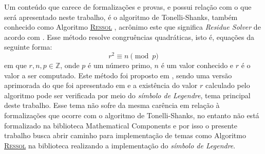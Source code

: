 
Um conteúdo que carece de formalizações e provas, e possui relação com o que será apresentado neste trabalho, é o algoritmo de Tonelli-Shanks, também conhecido como Algoritmo \hyperref[algo:ressol]{\textsc{Ressol}} \cite{Huynh1581080}, acrônimo este que significa \textit{Residue Solver} de acordo com \cite{Niven1915}. Esse método resolve congruências quadráticas, isto é, equações da seguinte forma:
\begin{equation}
    \label{eq:congruenciaquadratica}
    r^2 \equiv n \pmod p
\end{equation}
em que $r, n, p \in \mathbb{Z}$, onde $p$ é um número primo, $n$ é um valor conhecido e $r$ é o valor a ser computado. Este método foi proposto em , sendo uma versão aprimorada do que foi apresentado em \cite{Tonelli1891} e a existência do valor $r$ calculado pelo algoritmo pode ser verificada por meio do \textit{símbolo de Legendre}, tema principal deste trabalho. Esse tema não sofre da mesma carência em relação à formalizações que ocorre com o algoritmo de Tonelli-Shanks, no entanto não está formalizado na biblioteca Mathematical Components e por isso o presente trabalho busca abrir caminho para implementação de temas como Algoritmo \hyperref[algo:ressol]{\textsc{Ressol}} na biblioteca realizando a implementação do \textit{símbolo de Legendre}.

